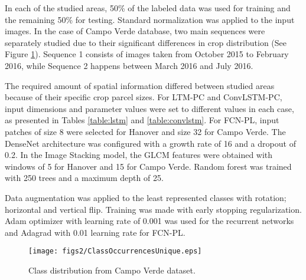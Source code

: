 In each of the studied areas, 50\% of the labeled data was used for training and the remaining 50\% for testing. Standard normalization was applied to the input images. In the case of Campo Verde database, two main sequences were separately studied due to their significant differences in crop distribution (See Figure \ref{fig:class_distr}). Sequence 1 consists of images taken from October 2015 to February 2016, while Sequence 2 happens between March 2016 and July 2016.

The required amount of spatial information differed between studied areas because of their specific crop parcel sizes. For LTM-PC and ConvLSTM-PC, input dimensions and parameter values were set to different values in each case, as presented in Tables \ref{table:lstm} and \ref{table:convlstm}. For FCN-PL, input patches of size 8 were selected for Hanover and size 32 for Campo Verde. The DenseNet architecture was configured with a growth rate of 16 and a dropout of 0.2. In the Image Stacking model, the GLCM features were obtained with windows of 5 for Hanover and 15 for Campo Verde. Random forest was trained with 250 trees and a maximum depth of 25. 

Data augmentation was applied to the least represented classes with rotation; horizontal and vertical flip. Training was made with early stopping regularization. Adam optimizer with learning rate of 0.001 was used for the recurrent networks and Adagrad with 0.01 learning rate for FCN-PL.  
\begin{figure}[t!]
\centering
\texttt{[image: figs2/ClassOccurrencesUnique.eps]}
\caption{Class distribution from Campo Verde dataset. }
\label{fig:class_distr}
\end{figure}

